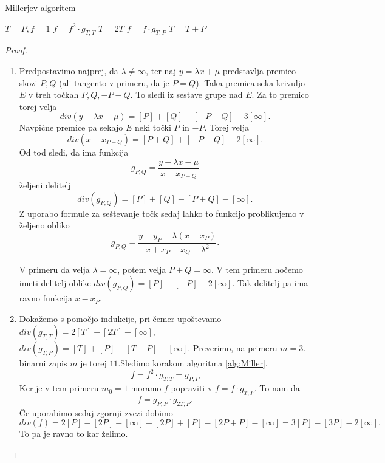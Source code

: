 \documentclass[12pt,a4paper,twoside]{article}
\theoremstyle{definition} %
\theoremstyle{plain} %
\numberwithin{equation}{section}  %
\begin{document}
\begin{algorithm}[H]
\caption[Miller]{Millerjev algoritem}
\label{alg:Miller}

\begin{algorithmic}
\State $T = P,f = 1$
	\State $f = f^2 \cdot g_{T,T}$
	\State $T = 2T$
		\State $f = f \cdot g_{T,P}$
		\State $T=T+P$
	\EndIf
	
\EndFor

\end{algorithmic}
\end{algorithm}

\begin{proof}
\begin{enumerate}
\item Predpostavimo najprej, da $\lambda \neq \infty$, ter naj $y = \lambda x + \mu$ predstavlja premico skozi $P,Q$ (ali tangento v primeru, da je $P=Q$). Taka premica seka krivuljo $E$ v treh točkah $P,Q,-P-Q$. To sledi iz sestave grupe nad $E$. Za to premico torej velja
$$div(y-\lambda x - \mu) = [P] + [Q] + [-P-Q] - 3[\infty].$$
Navpične premice pa sekajo $E$ neki točki $P$ in $-P$. Torej velja
$$div(x-x_{P+Q}) = [P+Q] + [-P-Q] - 2[\infty].$$
Od tod sledi, da ima funkcija
$$g_{P,Q} =\frac{y-\lambda x - \mu}{x-x_{P+Q}}$$
željeni delitelj
$$div(g_{P,Q}) = [P] + [Q] - [P+Q] - [\infty].$$
Z uporabo formule za seštevanje točk sedaj lahko to funkcijo problikujemo v željeno obliko
$$g_{P,Q} = \frac{y-y_P-\lambda(x-x_P)}{x+x_P+x_Q-\lambda^2} .$$

V primeru da velja $\lambda = \infty$, potem velja $P+Q = \infty$. V tem primeru hočemo imeti delitelj oblike $div(g_{P,Q}) = [P] + [-P] - 2[\infty]$. Tak delitelj pa ima ravno funkcija $x-x_P$.

\item Dokažemo s pomočjo indukcije, pri čemer upoštevamo $div(g_{T,T}) = 2[T]-[2T]-[\infty]$, $div(g_{T,P}) = [T]+[P]-[T+P]-[\infty]$.
Preverimo, na primeru $m = 3$. binarni zapis $m$ je torej $11$.Sledimo korakom algoritma \ref{alg:Miller}.
$$f = f^2 \cdot g_{T,T} = g_{P,P}$$
Ker je v tem primeru $m_0 = 1$ moramo $f$ popraviti v $f = f \cdot g_{T,P}$. To nam da
$$f = g_{P,P} \cdot g_{2T,P}.$$
Če uporabimo sedaj zgornji zvezi dobimo
$$div(f) = 2[P] - [2P] - [\infty] + [2P] + [P] - [2P+P] - [\infty] = 3[P] - [3P]-2[\infty].$$
To pa je ravno to kar želimo.

\end{enumerate}

\end{proof}
\end{document}
